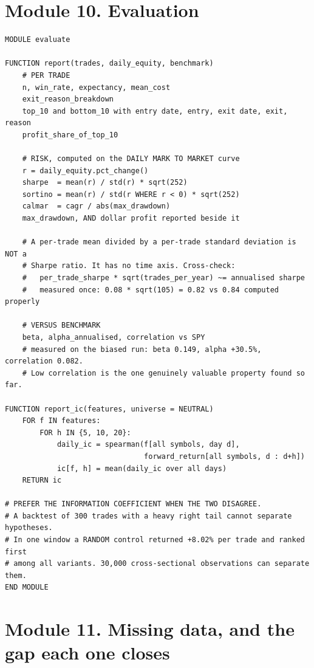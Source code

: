 \documentclass[10pt]{article}
\begin{document}
\section{Module 10. Evaluation}

\begin{lstlisting}
MODULE evaluate

FUNCTION report(trades, daily_equity, benchmark)
    # PER TRADE
    n, win_rate, expectancy, mean_cost
    exit_reason_breakdown
    top_10 and bottom_10 with entry date, entry, exit date, exit, reason
    profit_share_of_top_10

    # RISK, computed on the DAILY MARK TO MARKET curve
    r = daily_equity.pct_change()
    sharpe  = mean(r) / std(r) * sqrt(252)
    sortino = mean(r) / std(r WHERE r < 0) * sqrt(252)
    calmar  = cagr / abs(max_drawdown)
    max_drawdown, AND dollar profit reported beside it

    # A per-trade mean divided by a per-trade standard deviation is NOT a
    # Sharpe ratio. It has no time axis. Cross-check:
    #   per_trade_sharpe * sqrt(trades_per_year) ~= annualised sharpe
    #   measured once: 0.08 * sqrt(105) = 0.82 vs 0.84 computed properly

    # VERSUS BENCHMARK
    beta, alpha_annualised, correlation vs SPY
    # measured on the biased run: beta 0.149, alpha +30.5%, correlation 0.082.
    # Low correlation is the one genuinely valuable property found so far.

FUNCTION report_ic(features, universe = NEUTRAL)
    FOR f IN features:
        FOR h IN {5, 10, 20}:
            daily_ic = spearman(f[all symbols, day d],
                                forward_return[all symbols, d : d+h])
            ic[f, h] = mean(daily_ic over all days)
    RETURN ic

# PREFER THE INFORMATION COEFFICIENT WHEN THE TWO DISAGREE.
# A backtest of 300 trades with a heavy right tail cannot separate hypotheses.
# In one window a RANDOM control returned +8.02% per trade and ranked first
# among all variants. 30,000 cross-sectional observations can separate them.
END MODULE
\end{lstlisting}

\section{Module 11. Missing data, and the gap each one closes}
\end{document}
